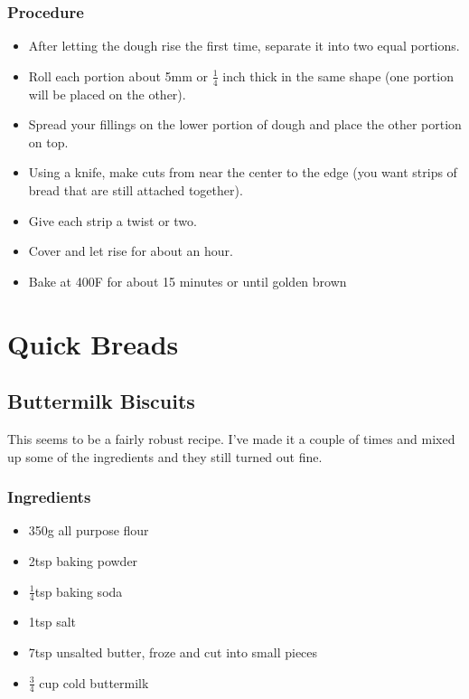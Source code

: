 \documentclass[10pt, openany]{book}
\begin{document}
\subsection{Procedure}
\begin{itemize}
  \item After letting the dough rise the first time, separate it into two equal portions.
  \item Roll each portion about 5mm or $\frac{1}{4}$ inch thick in the same shape (one portion will be placed on the other).
  \item Spread your fillings on the lower portion of dough and place the other portion on top.
  \item Using a knife, make cuts from near the center to the edge (you want strips of bread that are still attached together).
  \item Give each strip a twist or two.
  \item Cover and let rise for about an hour.
  \item Bake at 400\degree{}F for about 15 minutes or until golden brown
\end{itemize}
\chapter{Quick Breads}
\section{Buttermilk Biscuits}
This seems to be a fairly robust recipe.  I've made it a couple of times and mixed up some of the ingredients and they still turned out fine.
\subsection{Ingredients}
\begin{itemize}
  \item 350g all purpose flour
  \item 2tsp baking powder
  \item $\frac{1}{4}$tsp baking soda
  \item 1tsp salt
  \item 7tsp unsalted butter, froze and cut into small pieces
  \item $\frac{3}{4}$ cup cold buttermilk
\end{itemize}
\end{document}
